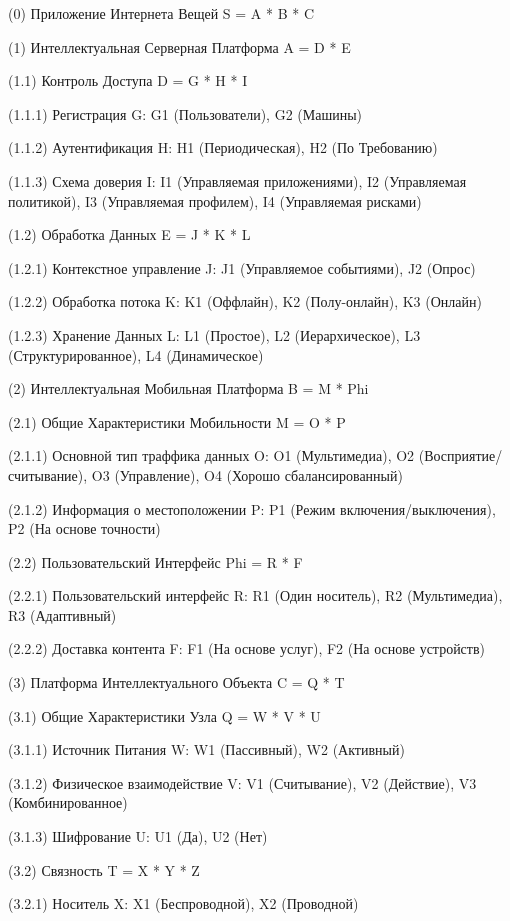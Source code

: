 (0) Приложение Интернета Вещей S = A * B * C

(1) Интеллектуальная Серверная Платформа A = D * E

(1.1) Контроль Доступа D = G * H * I

(1.1.1) Регистрация G: G1 (Пользователи), G2 (Машины)

(1.1.2) Аутентификация H: H1 (Периодическая), H2 (По Требованию)

(1.1.3) Схема доверия I: I1 (Управляемая приложениями), I2 (Управляемая политикой), I3 (Управляемая профилем), I4 (Управляемая рисками)

(1.2) Обработка Данных E = J * K * L

(1.2.1) Контекстное управление J: J1 (Управляемое событиями), J2 (Опрос)

(1.2.2) Обработка потока K: K1 (Оффлайн), K2 (Полу-онлайн), K3 (Онлайн)

(1.2.3) Хранение Данных L: L1 (Простое), L2 (Иерархическое), L3 (Структурированное), L4 (Динамическое)

(2) Интеллектуальная Мобильная Платформа B = M * Phi

(2.1) Общие Характеристики Мобильности M = O * P

(2.1.1) Основной тип траффика данных O: O1 (Мультимедиа), O2 (Восприятие/считывание), O3 (Управление), O4 (Хорошо сбалансированный)

(2.1.2) Информация о местоположении P: P1 (Режим включения/выключения), P2 (На основе точности)

(2.2) Пользовательский Интерфейс Phi = R * F

(2.2.1) Пользовательский интерфейс R: R1 (Один носитель), R2 (Мультимедиа), R3 (Адаптивный)

(2.2.2) Доставка контента F: F1 (На основе услуг), F2 (На основе устройств)

(3) Платформа Интеллектуального Объекта C = Q * T

(3.1) Общие Характеристики Узла Q = W * V * U

(3.1.1) Источник Питания W: W1 (Пассивный), W2 (Активный)

(3.1.2) Физическое взаимодействие V: V1 (Считывание), V2 (Действие), V3 (Комбинированное)

(3.1.3) Шифрование U: U1 (Да), U2 (Нет)

(3.2) Связность T = X * Y * Z

(3.2.1) Носитель X: X1 (Беспроводной), X2 (Проводной)

